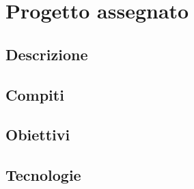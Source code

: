 \documentclass[twoside]{supsistudent}
\begin{document}
\maketitle
\onehalfspacing
\frontmatter




\newpage
\mainmatter
{}
\setcounter{page}{1}

\chapter{Progetto assegnato}


\section{Descrizione}









\section{Compiti}

\section{Obiettivi}

\section{Tecnologie}
\end{document}
